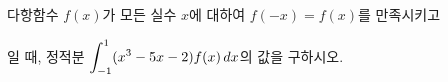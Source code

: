 다항함수 $f(x)$가 모든 실수 $x$에 대하여 $f(-x)=f(x)$를 만족시키고 \par\smallskip{}\par\smallskip\noindent 일 때, 정적분 $\displaystyle\int_{-1}^{1}(x^3-5x-2)f(x)\mkern3mu dx$의 값을 구하시오.
